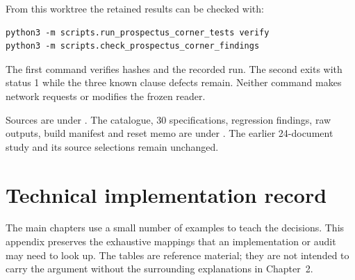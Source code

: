 \documentclass[12pt,a4paper,oneside,openany]{book}
\begin{document}
From this worktree the retained results can be checked with:
\begin{lstlisting}
python3 -m scripts.run_prospectus_corner_tests verify
python3 -m scripts.check_prospectus_corner_findings
\end{lstlisting}
The first command verifies hashes and the recorded run. The second exits
with status 1 while the three known clause defects remain. Neither command
makes network requests or modifies the frozen reader.

Sources are under .
The catalogue, 30 specifications, regression findings, raw outputs, build
manifest and reset memo are under
.
The earlier 24-document study and its source selections remain unchanged.

\chapter{Technical implementation record}
\label{app:implementation-record}

The main chapters use a small number of examples to teach the decisions. This
appendix preserves the exhaustive mappings that an implementation or audit may
need to look up. The tables are reference material; they are not intended to
carry the argument without the surrounding explanations in Chapter~2.
\end{document}
